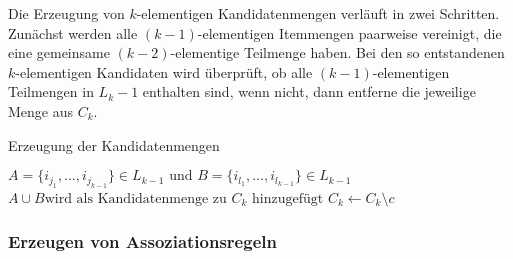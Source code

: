 Die Erzeugung von $k$-elementigen Kandidatenmengen verläuft in zwei Schritten. Zunächst werden alle $(k-1)$-elementigen Itemmengen paarweise vereinigt, die eine gemeinsame $(k-2)$-elementige Teilmenge haben. Bei den so entstandenen $k$-elementigen Kandidaten wird überprüft, ob alle $(k-1)$-elementigen Teilmengen in $L_k-1$ enthalten sind, wenn nicht, dann entferne die jeweilige Menge aus $C_k$.

\begin{algorithm}
	\caption{Erzeugung der Kandidatenmengen}
	\label{apriori-gen}
\begin{algorithmic}
	\STATE {}
	\STATE $A = \{i_{j_1},\ldots, i_{j_{k-1}}\} \in L_{k-1} \text{ und } B = \{i_{l_1},\ldots, i_{l_{k-1}}\} \in L_{k-1}$
		\STATE $A \cup B \text{wird als Kandidatenmenge zu } C_k \text{ hinzugefügt}$
	\ENDIF
	\STATE {}
			\STATE $C_k \gets C_k \setminus c$
		\ENDIF
		\ENDFOR
	\ENDFOR
\end{algorithmic}
\end{algorithm}
\subsubsection{Erzeugen von Assoziationsregeln}

